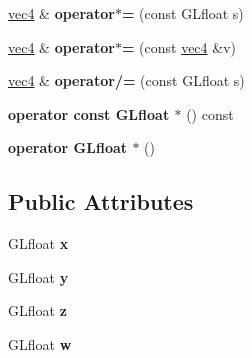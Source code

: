 \begin{DoxyCompactItemize}
\item 
\hypertarget{struct_angel_1_1vec4_aab6ea06360d12b1e2962d6c4ea4dc639}{\hyperlink{struct_angel_1_1vec4}{vec4} \& {\bfseries operator$\ast$=} (const G\-Lfloat s)}\label{struct_angel_1_1vec4_aab6ea06360d12b1e2962d6c4ea4dc639}

\item 
\hypertarget{struct_angel_1_1vec4_a2035c8e93278408c05404b713346d92d}{\hyperlink{struct_angel_1_1vec4}{vec4} \& {\bfseries operator$\ast$=} (const \hyperlink{struct_angel_1_1vec4}{vec4} \&v)}\label{struct_angel_1_1vec4_a2035c8e93278408c05404b713346d92d}

\item 
\hypertarget{struct_angel_1_1vec4_aacad340463007e48c1674689787e6b47}{\hyperlink{struct_angel_1_1vec4}{vec4} \& {\bfseries operator/=} (const G\-Lfloat s)}\label{struct_angel_1_1vec4_aacad340463007e48c1674689787e6b47}

\item 
\hypertarget{struct_angel_1_1vec4_a71c7509461ea7152c6785bfbc811ab64}{{\bfseries operator const G\-Lfloat $\ast$} () const }\label{struct_angel_1_1vec4_a71c7509461ea7152c6785bfbc811ab64}

\item 
\hypertarget{struct_angel_1_1vec4_abe6702f74ba431df65da55aa0df6de16}{{\bfseries operator G\-Lfloat $\ast$} ()}\label{struct_angel_1_1vec4_abe6702f74ba431df65da55aa0df6de16}

\end{DoxyCompactItemize}
\subsection*{Public Attributes}
\begin{DoxyCompactItemize}
\item 
\hypertarget{struct_angel_1_1vec4_aaf7881acf82e877f889905a1573d36ad}{G\-Lfloat {\bfseries x}}\label{struct_angel_1_1vec4_aaf7881acf82e877f889905a1573d36ad}

\item 
\hypertarget{struct_angel_1_1vec4_a2396916bf1051ee7d6c11e6f2a539308}{G\-Lfloat {\bfseries y}}\label{struct_angel_1_1vec4_a2396916bf1051ee7d6c11e6f2a539308}

\item 
\hypertarget{struct_angel_1_1vec4_ab62654db1d62f75cb4d1bec9e4543797}{G\-Lfloat {\bfseries z}}\label{struct_angel_1_1vec4_ab62654db1d62f75cb4d1bec9e4543797}

\item 
\hypertarget{struct_angel_1_1vec4_a27752dffc3cd1ac7aa2fc72d40a84a48}{G\-Lfloat {\bfseries w}}\label{struct_angel_1_1vec4_a27752dffc3cd1ac7aa2fc72d40a84a48}

\end{DoxyCompactItemize}
